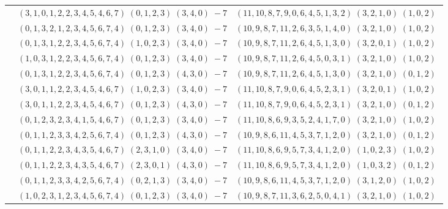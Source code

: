\documentclass[11pt]{article}
\begin{document}
\begin{longtable}[l]{|c|c|c|}
 \cline{2-3} 
 & $(3 ,1 ,0 ,1 ,2 ,2 ,3 ,4 ,5 ,4 ,6 ,7) \;(0 ,1 ,2 ,3) \;(3 ,4 ,0) \;-7$ & $(11 ,10 ,8 ,7 ,9 ,0 ,6 ,4 ,5 ,1 ,3 ,2) \;(3 ,2 ,1 ,0) \;(1 ,0 ,2) \;$\\ 
 \cline{2-3} 
 & $(0 ,1 ,3 ,2 ,1 ,2 ,3 ,4 ,5 ,6 ,7 ,4) \;(0 ,1 ,2 ,3) \;(3 ,4 ,0) \;-7$ & $(10 ,9 ,8 ,7 ,11 ,2 ,6 ,3 ,5 ,1 ,4 ,0) \;(3 ,2 ,1 ,0) \;(1 ,0 ,2) \;$\\ 
 \cline{2-3} 
 & $(0 ,1 ,3 ,1 ,2 ,2 ,3 ,4 ,5 ,6 ,7 ,4) \;(1 ,0 ,2 ,3) \;(3 ,4 ,0) \;-7$ & $(10 ,9 ,8 ,7 ,11 ,2 ,6 ,4 ,5 ,1 ,3 ,0) \;(3 ,2 ,0 ,1) \;(1 ,0 ,2) \;$\\ 
 \cline{2-3} 
 & $(1 ,0 ,3 ,1 ,2 ,2 ,3 ,4 ,5 ,6 ,7 ,4) \;(0 ,1 ,2 ,3) \;(3 ,4 ,0) \;-7$ & $(10 ,9 ,8 ,7 ,11 ,2 ,6 ,4 ,5 ,0 ,3 ,1) \;(3 ,2 ,1 ,0) \;(1 ,0 ,2) \;$\\ 
 \cline{2-3} 
 & $(0 ,1 ,3 ,1 ,2 ,2 ,3 ,4 ,5 ,6 ,7 ,4) \;(0 ,1 ,2 ,3) \;(4 ,3 ,0) \;-7$ & $(10 ,9 ,8 ,7 ,11 ,2 ,6 ,4 ,5 ,1 ,3 ,0) \;(3 ,2 ,1 ,0) \;(0 ,1 ,2) \;$\\ 
 \cline{2-3} 
 & $(3 ,0 ,1 ,1 ,2 ,2 ,3 ,4 ,5 ,4 ,6 ,7) \;(1 ,0 ,2 ,3) \;(3 ,4 ,0) \;-7$ & $(11 ,10 ,8 ,7 ,9 ,0 ,6 ,4 ,5 ,2 ,3 ,1) \;(3 ,2 ,0 ,1) \;(1 ,0 ,2) \;$\\ 
 \cline{2-3} 
 & $(3 ,0 ,1 ,1 ,2 ,2 ,3 ,4 ,5 ,4 ,6 ,7) \;(0 ,1 ,2 ,3) \;(4 ,3 ,0) \;-7$ & $(11 ,10 ,8 ,7 ,9 ,0 ,6 ,4 ,5 ,2 ,3 ,1) \;(3 ,2 ,1 ,0) \;(0 ,1 ,2) \;$\\ 
 \cline{2-3} 
 & $(0 ,1 ,2 ,3 ,2 ,3 ,4 ,1 ,5 ,4 ,6 ,7) \;(0 ,1 ,2 ,3) \;(3 ,4 ,0) \;-7$ & $(11 ,10 ,8 ,6 ,9 ,3 ,5 ,2 ,4 ,1 ,7 ,0) \;(3 ,2 ,1 ,0) \;(1 ,0 ,2) \;$\\ 
 \cline{2-3} 
 & $(0 ,1 ,1 ,2 ,3 ,3 ,4 ,2 ,5 ,6 ,7 ,4) \;(0 ,1 ,2 ,3) \;(4 ,3 ,0) \;-7$ & $(10 ,9 ,8 ,6 ,11 ,4 ,5 ,3 ,7 ,1 ,2 ,0) \;(3 ,2 ,1 ,0) \;(0 ,1 ,2) \;$\\ 
 \cline{2-3} 
 & $(0 ,1 ,1 ,2 ,2 ,3 ,4 ,3 ,5 ,4 ,6 ,7) \;(2 ,3 ,1 ,0) \;(3 ,4 ,0) \;-7$ & $(11 ,10 ,8 ,6 ,9 ,5 ,7 ,3 ,4 ,1 ,2 ,0) \;(1 ,0 ,2 ,3) \;(1 ,0 ,2) \;$\\ 
 \cline{2-3} 
 & $(0 ,1 ,1 ,2 ,2 ,3 ,4 ,3 ,5 ,4 ,6 ,7) \;(2 ,3 ,0 ,1) \;(4 ,3 ,0) \;-7$ & $(11 ,10 ,8 ,6 ,9 ,5 ,7 ,3 ,4 ,1 ,2 ,0) \;(1 ,0 ,3 ,2) \;(0 ,1 ,2) \;$\\ 
 \cline{2-3} 
 & $(0 ,1 ,1 ,2 ,3 ,3 ,4 ,2 ,5 ,6 ,7 ,4) \;(0 ,2 ,1 ,3) \;(3 ,4 ,0) \;-7$ & $(10 ,9 ,8 ,6 ,11 ,4 ,5 ,3 ,7 ,1 ,2 ,0) \;(3 ,1 ,2 ,0) \;(1 ,0 ,2) \;$\\ 
 \cline{2-3} 
 & $(1 ,0 ,2 ,3 ,1 ,2 ,3 ,4 ,5 ,6 ,7 ,4) \;(0 ,1 ,2 ,3) \;(3 ,4 ,0) \;-7$ & $(10 ,9 ,8 ,7 ,11 ,3 ,6 ,2 ,5 ,0 ,4 ,1) \;(3 ,2 ,1 ,0) \;(1 ,0 ,2) \;$\\ 

\end{longtable}
\end{document}
